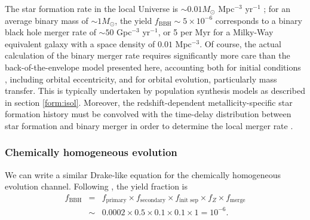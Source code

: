 \documentclass[review]{elsarticle}
\begin{document}
The star formation rate in the local Universe is $\sim 0.01 M_\odot$ Mpc$^{-3}$ yr$^{-1}$ \citep{MadauDickinson:2014}; for an average binary mass of $\sim 1 M_\odot$, the yield $f_\textrm{BBH} \sim 5 \times 10^{-6}$ corresponds to a binary black hole merger rate of $\sim 50$ Gpc$^{-3}$ yr$^{-1}$, or 5 per Myr for a Milky-Way equivalent galaxy with a space density of $0.01$ Mpc$^{-3}$.  Of course, the actual calculation of the binary merger rate requires significantly more care than the back-of-the-envelope model presented here, accounting both for initial conditions \citep{deMinkBelczynski:2015,MoeDiStefano:2017}, including orbital eccentricity, and for orbital evolution, particularly mass transfer.   This is typically undertaken by population synthesis models as described in section \ref{form:isol}.  Moreover, the redshift-dependent metallicity-specific star formation history must be convolved with the time-delay distribution between star formation and binary merger in order to determine the local merger rate \citep{Belczynski:2010,Mapelli:2017,Klencki:2018,Chruslinska:2019,Neijssel:2019,ChruslinskaNelemans:2019,Tang:2020,Broekgaarden:2021,Santoliquido:2021}.  

\subsubsection{Chemically homogeneous evolution}

We can write a similar Drake-like equation for the chemically homogeneous evolution channel.  Following \citet{MandeldeMink:2016},  the yield fraction is
\begin{eqnarray}
f_\textrm{BBH} &=& f_\textrm{primary} \times f_\textrm{secondary} \times f_\textrm{init sep} \times f_Z \times f_\textrm{merge} \nonumber \\
 & \sim & 0.0002 \times 0.5 \times 0.1 \times 0.1 \times 1 = 10^{-6}.
\end{eqnarray}
\end{document}
